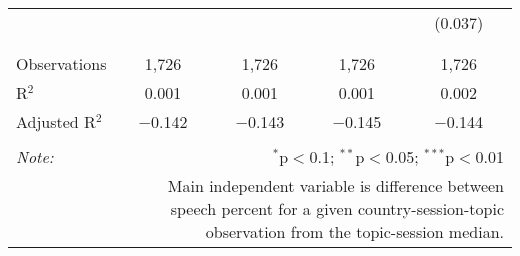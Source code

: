 \begin{table}[!htbp]
\begin{tabular}{@{\extracolsep{5pt}}lcccc}
  &  &  &  & (0.037) \\ 
  & & & & \\ 
\hline \\[-1.8ex] 
Observations & 1,726 & 1,726 & 1,726 & 1,726 \\ 
R$^{2}$ & 0.001 & 0.001 & 0.001 & 0.002 \\ 
Adjusted R$^{2}$ & $-$0.142 & $-$0.143 & $-$0.145 & $-$0.144 \\ 
\hline 
\hline \\[-1.8ex] 
\textit{Note:}  & \multicolumn{4}{r}{$^{*}$p$<$0.1; $^{**}$p$<$0.05; $^{***}$p$<$0.01} \\ 
 & \multicolumn{4}{r}{Main independent variable is difference between speech percent for a given country-session-topic observation from the topic-session median.} \\ 
\end{tabular} 
\end{table} 

